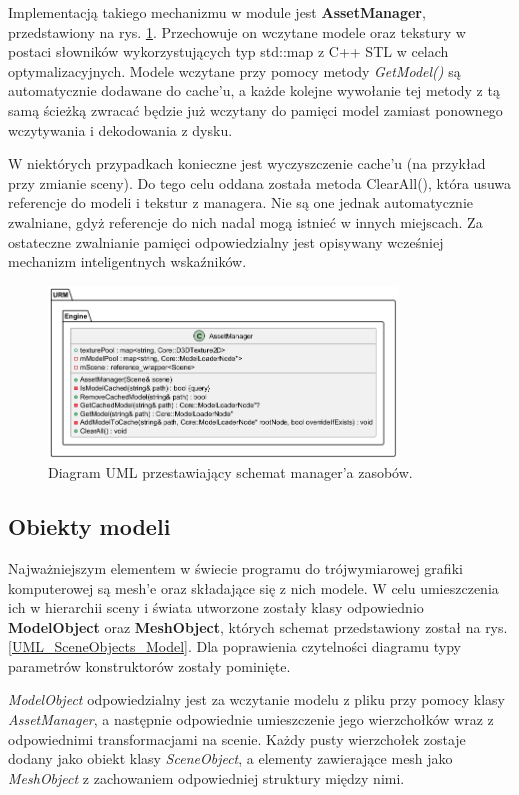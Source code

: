 	Implementacją takiego mechanizmu w module jest \textbf{AssetManager}, przedstawiony na rys. \ref{UML_AssetManager}. Przechowuje on wczytane modele oraz tekstury w postaci słowników wykorzystujących typ std::map z C++ STL w celach optymalizacyjnych. Modele wczytane przy pomocy metody \textit{GetModel()} są automatycznie dodawane do cache'u, a każde kolejne wywołanie tej metody z tą samą ścieżką zwracać będzie już wczytany do pamięci model zamiast ponownego wczytywania i dekodowania z dysku.
	
	W niektórych przypadkach konieczne jest wyczyszczenie cache'u (na przykład przy zmianie sceny). Do tego celu oddana została metoda ClearAll(), która usuwa referencje do modeli i tekstur z managera. Nie są one jednak automatycznie zwalniane, gdyż referencje do nich nadal mogą istnieć w innych miejscach. Za ostateczne zwalnianie pamięci odpowiedzialny jest opisywany wcześniej mechanizm inteligentnych wskaźników.
	
	\begin{figure}[h!]
		\centering
		\includegraphics[width=350px]{images/UML/assets.png}
		\caption{Diagram UML przestawiający schemat manager'a zasobów.}
		\label{UML_AssetManager}
	\end{figure}
	
	
\subsection{Obiekty modeli}
	Najważniejszym elementem w świecie programu do trójwymiarowej grafiki komputerowej są mesh'e oraz składające się z nich modele. W celu umieszczenia ich w hierarchii sceny i świata utworzone zostały klasy odpowiednio \textbf{ModelObject} oraz \textbf{MeshObject}, których schemat przedstawiony został na rys. \ref{UML_SceneObjects_Model}. Dla poprawienia czytelności diagramu typy parametrów konstruktorów zostały pominięte.
	
	\textit{ModelObject} odpowiedzialny jest za wczytanie modelu z pliku przy pomocy klasy \textit{AssetManager}, a następnie odpowiednie umieszczenie jego wierzchołków wraz z odpowiednimi transformacjami na scenie. Każdy pusty wierzchołek zostaje dodany jako obiekt klasy \textit{SceneObject}, a elementy zawierające mesh jako \textit{MeshObject} z zachowaniem odpowiedniej struktury między nimi.
	
